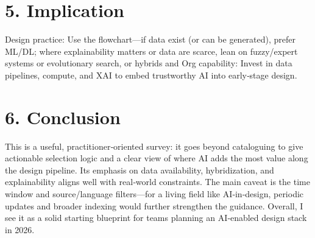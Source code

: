 \documentclass{article}
\begin{document}
\section*{5. Implication}
Design practice: Use the flowchart—if data exist (or can be generated), prefer ML/DL; where explainability matters or data are scarce, lean on fuzzy/expert systems or evolutionary search, or hybrids and Org capability: Invest in data pipelines, compute, and XAI to embed trustworthy AI into early‑stage design.

\section*{6. Conclusion}
This is a useful, practitioner‑oriented survey: it goes beyond cataloguing to give actionable selection logic and a clear view of where AI adds the most value along the design pipeline. Its emphasis on data availability, hybridization, and explainability aligns well with real‑world constraints. The main caveat is the time window and source/language filters—for a living field like AI‑in‑design, periodic updates and broader indexing would further strengthen the guidance. Overall, I see it as a solid starting blueprint for teams planning an AI‑enabled design stack in 2026.
\end{document}

